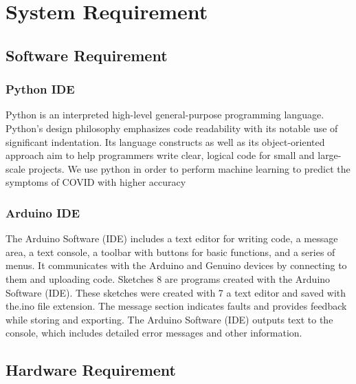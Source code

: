 \documentclass[a4paper,12pt]{report}
\begin{document}
\chapter{System Requirement}
\section{Software Requirement}
\subsection{Python IDE}
Python is an interpreted high-level general-purpose programming language. Python’s design
philosophy emphasizes code readability with its notable use of significant indentation. Its
language constructs as well as its object-oriented approach aim to help programmers write
clear, logical code for small and large-scale projects. We use python in order to perform
machine learning to predict the symptoms of COVID with higher accuracy
\subsection{Arduino IDE}
The Arduino Software (IDE) includes a text editor for writing code, a message area, a text
console, a toolbar with buttons for basic functions, and a series of menus. It communicates
with the Arduino and Genuino devices by connecting to them and uploading code. Sketches
8 are programs created with the Arduino Software (IDE). These sketches were created with
7
a text editor and saved with the.ino file extension. The message section indicates faults and
provides feedback while storing and exporting. The Arduino Software (IDE) outputs text
to the console, which includes detailed error messages and other information.
\pagebreak
\section{Hardware Requirement}
\end{document}
